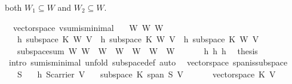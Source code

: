 \begin{isabellebody}
\begin{isamarkuptext}
both $W_1\subseteq W$ and $W_2\subseteq W$.%
\end{isamarkuptext}%
\isamarkuptrue%
\isamarkupfalse%
\ {\isacharparenleft}\ vectorspace{\isacharparenright}\ vsum{\isacharunderscore}is{\isacharunderscore}minimal{\isacharcolon}\isanewline
\ \ \ W\ W{}\ W{}\isanewline
\ \ \ h{}{\isacharcolon}\ {\isachardoublequoteopen}subspace\ K\ W{}\ V{\isachardoublequoteclose}\ \ h{}{\isacharcolon}\ {\isachardoublequoteopen}subspace\ K\ W{}\ V{\isachardoublequoteclose}\ \ h{}{\isacharcolon}\ {\isachardoublequoteopen}subspace\ K\ W\ V{\isachardoublequoteclose}\isanewline
\ \ \ {\isachardoublequoteopen}{\isacharparenleft}subspace{\isacharunderscore}sum\ W{}\ W{}{\isacharparenright}\ {\isasymsubseteq}\ W\ {\isasymlongleftrightarrow}\ W{}\ {\isasymsubseteq}\ W\ {\isasymand}\ W{}\ {\isasymsubseteq}\ W{\isachardoublequoteclose}\isanewline
%
\isadelimproof
%
\endisadelimproof
%
\isatagproof
{}\isamarkupfalse%
\ {\isacharminus}\ \isanewline
\ \ \isamarkupfalse%
\ h{}\ h{}\ h{}\ \isamarkupfalse%
\ {\isacharquery}thesis\ \isamarkupfalse%
\ {\isacharparenleft}intro\ sum{\isacharunderscore}is{\isacharunderscore}minimal{\isacharcomma}\ unfold\ subspace{\isacharunderscore}def{\isacharcomma}\ auto{\isacharparenright}\isanewline
{}\isamarkupfalse%
%
\endisatagproof
{\isafoldproof}%
%
\isadelimproof
\isanewline
%
\endisadelimproof
\isanewline
\isanewline
{}\isamarkupfalse%
\ {\isacharparenleft}\ vectorspace{\isacharparenright}\ span{\isacharunderscore}is{\isacharunderscore}subspace{\isacharcolon}\isanewline
\ \ \ S\isanewline
\ \ \ h{}{\isacharcolon}\ {\isachardoublequoteopen}S{\isasymsubseteq}carrier\ V{\isachardoublequoteclose}\isanewline
\ \ \ {\isachardoublequoteopen}subspace\ K\ {\isacharparenleft}span\ S{\isacharparenright}\ V{\isachardoublequoteclose}\isanewline
%
\isadelimproof
%
\endisadelimproof
%
\isatagproof
{}\isamarkupfalse%
\ {\isacharminus}\isanewline
\ \ \isamarkupfalse%
\ {}{\isacharcolon}\ {\isachardoublequoteopen}vectorspace\ K\ V{\isachardoublequoteclose}\isacommand{{\isachardot}{\isachardot}}\isamarkupfalse%
\isanewline
\ \ \isamarkupfalse%

\end{isabellebody}
